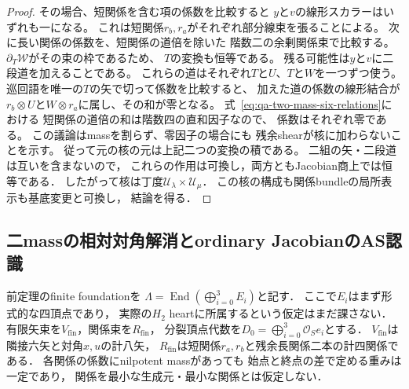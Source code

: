 \begin{proof}
その場合、短関係を含む項の係数を比較すると
$y$と$v$の線形スカラーはいずれも一になる。
これは短関係$r_b,r_a$がそれぞれ部分線束を張ることによる。
次に長い関係の係数を、短関係の道倍を除いた
階数二の余剰関係束で比較する。
$\partial_T\mathcal W$がその束の枠であるため、
$T$の変換も恒等である。
残る可能性は$y$と$v$に二段道を加えることである。
これらの道はそれぞれ$T$と$U$、$T$と$W$を一つずつ使う。
巡回語を唯一の$T$の矢で切って係数を比較すると、
加えた道の係数の線形結合が
$r_b\otimes U$と$W\otimes r_a$に属し、その和が零となる。
式~\eqref{eq:qa-two-mass-six-relations}における
短関係の道倍の和は階数四の直和因子なので、
係数はそれぞれ零である。
この議論はmassを割らず、零因子の場合にも
残余shearが核に加わらないことを示す。
従って元の核の元は上記二つの変換の積である。
二組の矢・二段道は互いを含まないので，
これらの作用は可換し，両方ともJacobian商上では恒等である．
したがって核は丁度$\mathcal U_\lambda\times\mathcal U_\mu$．
この核の構成も関係bundleの局所表示も基底変更と可換し，
結論を得る．
\end{proof}


\subsection{二massの相対対角解消とordinary JacobianのAS認識}
\label{subsec:qa-two-mass-diagonal-serre-comparison}

前定理のfinite foundationを
$\Lambda=\operatorname{End}(\bigoplus_{i=0}^3 E_i)$と記す．
ここで$E_i$はまず形式的な四頂点であり，
実際の$H_2$ heartに所属するという仮定はまだ課さない．
有限矢束を$V_{\mathrm{fin}}$，関係束を$R_{\mathrm{fin}}$，
分裂頂点代数を$D_0=\bigoplus_{i=0}^3\mathcal O_Se_i$とする．
$V_{\mathrm{fin}}$は隣接六矢と対角$x,u$の計八矢，
$R_{\mathrm{fin}}$は短関係$r_a,r_b$と残余長関係二本の計四関係である．
各関係の係数にnilpotent massがあっても
始点と終点の差で定める重みは一定であり，
関係を最小な生成元・最小な関係とは仮定しない．

